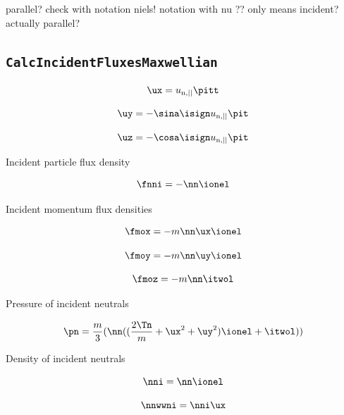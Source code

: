parallel? check with notation niels! notation with nu ?? only means incident? actually parallel?




\subsection{\texttt{CalcIncidentFluxesMaxwellian}}

\begin{equation}
    \ux = u_{\mathrm{n},||} \pitt
\end{equation}

\begin{equation}
    \uy = - \sina \isign u_{\mathrm{n},||} \pit
\end{equation}

\begin{equation}
    \uz = - \cosa \isign u_{\mathrm{n},||} \pit
\end{equation}

Incident particle flux density

\begin{equation}
    \fnni = - \nn \ionel
\end{equation}

Incident momentum flux densities

\begin{equation}
    \fmox = - m \nn \ux \ionel
\end{equation}

\begin{equation}
    \fmoy = - m \nn \uy \ionel
\end{equation}

\begin{equation}
    \fmoz = -m \nn \itwol
\end{equation}

Pressure of incident neutrals

\begin{equation}
    \pn = \frac{m}{3} (\nn ((\frac{2 \Tn}{m} + \ux^2 + \uy^2) \ionel + \itwol))
\end{equation}

Density of incident neutrals

\begin{equation}
    \nni = \nn \ionel
\end{equation}

\begin{equation}
    \nnwwni = \nni \ux
\end{equation}

